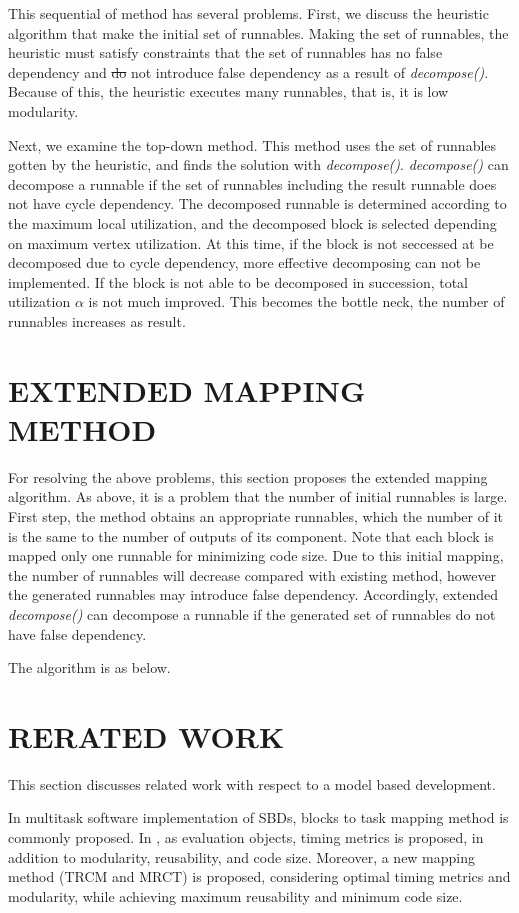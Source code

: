 \documentclass[conference,compsoc]{IEEEtran}
\providecommand{\DIFadd}[1]{{\protect\color{blue}\uwave{#1}}} %
\providecommand{\DIFdel}[1]{{\protect\color{red}\sout{#1}}}                      %
\providecommand{\DIFaddbegin}{} %
\providecommand{\DIFaddend}{} %
\providecommand{\DIFdelbegin}{} %
\providecommand{\DIFdelend}{} %
\begin{document}
 This sequential of method has several problems.
First, we discuss the heuristic algorithm that make the initial set of runnables.
Making the set of runnables, the heuristic must satisfy constraints that the set of runnables has no false dependency and \DIFdelbegin \DIFdel{do }\DIFdelend \DIFaddbegin \DIFadd{does }\DIFaddend not introduce false dependency as a result of {\it decompose()}.
Because of this, the heuristic executes many runnables, that is, it is low modularity.

Next, we examine the top-down method.
This method uses the set of runnables gotten by the heuristic, and finds the solution with {\it decompose()}.
{\it decompose()} can decompose a runnable if the set of runnables including the result runnable does not have cycle dependency.
The decomposed runnable is determined according to the maximum local utilization, and the decomposed block is selected depending on maximum vertex utilization.
At this time, if the block is not seccessed at be decomposed due to cycle dependency, more effective decomposing can not be implemented.
If the block is not able to be decomposed in succession, total utilization $\alpha$ is not much improved.
This becomes the bottle neck, the number of runnables increases as result.

\section{EXTENDED MAPPING METHOD}
 For resolving the above problems, this section proposes the extended mapping algorithm.
As above, it is a problem that the number of initial runnables is large.
First step, the method obtains an appropriate runnables, which the number of it is the same to the number of outputs of its component.
Note that each block is mapped only one runnable for minimizing code size.
Due to this initial mapping, the number of runnables will decrease compared with existing method, however the generated runnables may introduce false dependency.
Accordingly, extended {\it decompose()} can decompose a runnable if the generated set of runnables do not have false dependency.

The algorithm is as below.


\section{RERATED WORK}
 This section discusses related work with respect to a model based development.

 In multitask software implementation of SBDs, blocks to task mapping method is commonly proposed.
In \cite{6871195}, as evaluation objects, timing metrics is proposed, in addition to modularity, reusability, and code size.
Moreover, a new mapping method (TRCM and MRCT) is proposed, considering optimal timing metrics and modularity, while achieving maximum reusability and minimum code size. 
\end{document}
